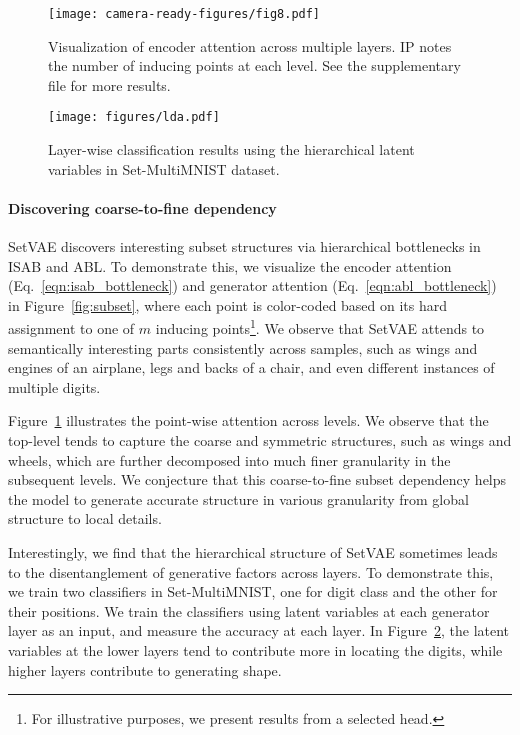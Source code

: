 \documentclass[final]{arxiv/cvpr}
\newcommand{\cutparagraphup}{\vspace*{-0.1in}}
\begin{document}
\begin{figure}[!t]
    \centering
    \texttt{[image: camera-ready-figures/fig8.pdf]}
    \vspace{-0.35cm}
    \caption{Visualization of encoder attention across multiple layers.
    IP notes the number of inducing points at each level.
    See the supplementary file for more results.
    }
    \label{fig:composition}
    \vspace{-0.35cm}
\end{figure}
\begin{figure}[!t]
\centering
    \texttt{[image: figures/lda.pdf]}
    \vspace{-0.3cm}
    \caption{
    Layer-wise classification results using the hierarchical latent variables in Set-MultiMNIST dataset.
    }
    \label{fig:lda}
    \vspace{-0.6cm}
\end{figure}

\cutparagraphup
\paragraph{Discovering coarse-to-fine dependency}
SetVAE discovers interesting subset structures via hierarchical bottlenecks in ISAB and ABL.
To demonstrate this, we visualize the encoder attention (Eq.~\eqref{eqn:isab_bottleneck}) and generator attention (Eq.~\eqref{eqn:abl_bottleneck}) in Figure~\ref{fig:subset}, where each point is color-coded based on its hard assignment to one of $m$ inducing points\footnote{For illustrative purposes, we present results from a selected head.}.
We observe that SetVAE attends to semantically interesting parts consistently across samples, such as wings and engines of an airplane, legs and backs of a chair, and even different instances of multiple digits.

Figure~\ref{fig:composition} illustrates the point-wise attention across levels.
We observe that the top-level tends to capture the coarse and symmetric structures, such as wings and wheels, which are further decomposed into much finer granularity in the subsequent levels.
We conjecture that this coarse-to-fine subset dependency helps the model to generate accurate structure in various granularity from global structure to local details.

Interestingly, we find that the hierarchical structure of SetVAE sometimes leads to the disentanglement of generative factors across layers.
To demonstrate this, we train two classifiers in Set-MultiMNIST, one for digit class and the other for their positions.
We train the classifiers using latent variables at each generator layer as an input, and measure the accuracy at each layer.
In Figure~\ref{fig:lda}, the latent variables at the lower layers tend to contribute more in locating the digits, while higher layers contribute to generating shape.
\end{document}
